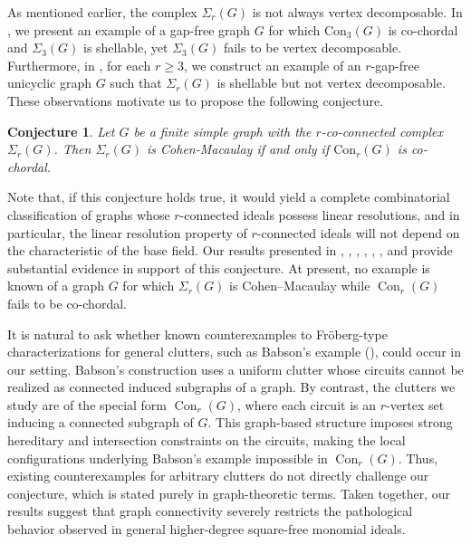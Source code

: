 \documentclass[12pt,reqno]{amsart}
\newtheorem{conjecture}[proposition]{Conjecture}
\theoremstyle{definition}
\begin{document}
As mentioned earlier, the complex $\Sigma_r(G)$ is not always vertex decomposable. In , we present an example of a gap-free graph $G$ for which $\mathrm{Con}_3(G)$ is co-chordal and $\Sigma_3(G)$ is shellable, yet $\Sigma_3(G)$ fails to be vertex decomposable. Furthermore, in , for each $r\ge 3$, we construct an example of an $r$-gap-free unicyclic graph $G$ such that $\Sigma_r(G)$ is shellable but not vertex decomposable. These observations motivate us to propose the following conjecture.
		\begin{conjecture}\label{conj1}
		Let $G$ be a finite simple graph with the $r$-co-connected complex $\Sigma_r(G)$. Then $\Sigma_r(G)$ is Cohen-Macaulay if and only if $\mathrm{Con}_r(G)$ is co-chordal.
	\end{conjecture}
Note that, if this conjecture holds true, it would yield a complete combinatorial classification of graphs whose $r$-connected ideals possess linear resolutions, and in particular, the linear resolution property of $r$-connected ideals will not depend on the characteristic of the base field. Our results presented in , , , , , , and  provide substantial evidence in support of this conjecture.
At present, no example is known of a graph $G$ for which $\Sigma_r(G)$ is Cohen–Macaulay while $\operatorname{Con}_r(G)$ fails to be co-chordal.


It is natural to ask whether known counterexamples to Fröberg-type characterizations for general clutters, such as Babson’s example (\cite[Example 2.4]{CCVD}), could occur in our setting.
Babson’s construction uses a uniform clutter whose circuits cannot be realized as connected induced subgraphs of a graph.
By contrast, the clutters we study are of the special form $\operatorname{Con}_r(G)$, where each circuit is an $r$-vertex set inducing a connected subgraph of $G$.
This graph-based structure imposes strong hereditary and intersection constraints on the circuits, making the local configurations underlying Babson’s example impossible in $\operatorname{Con}_r(G)$.
Thus, existing counterexamples for arbitrary clutters do not directly challenge our conjecture, which is stated purely in graph-theoretic terms.
Taken together, our results suggest that graph connectivity severely restricts the pathological behavior observed in general higher-degree square-free monomial ideals.
\end{document}
